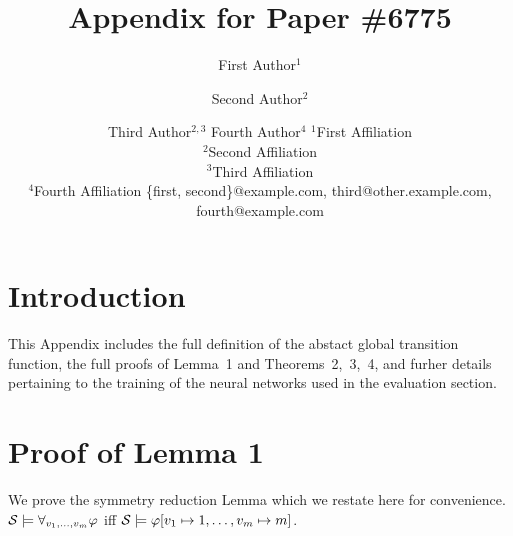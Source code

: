 \documentclass{article}
\title{Appendix for Paper \#6775}
\author{
}
\author{
First Author$^1$
\and
Second Author$^2$\and
Third Author$^{2,3}$\And
Fourth Author$^4$
\affiliations
$^1$First Affiliation\\
$^2$Second Affiliation\\
$^3$Third Affiliation\\
$^4$Fourth Affiliation
\emails
\{first, second\}@example.com,
third@other.example.com,
fourth@example.com
}
\newenvironment{customlemma}[1]
  {\renewcommand\theinnercustomlemma{#1}\innercustomlemma}
  {\endinnercustomlemma}
\begin{document}
\maketitle


\section{Introduction}

This Appendix includes the full definition of the abstact global transition
function, the full proofs of Lemma~1 and Theorems~2,~3,~4, and furher details
pertaining to the training of the neural networks used in the evaluation
section.

\section{Proof of Lemma 1} 
We prove the symmetry reduction Lemma which we restate here for convenience.
\begin{customlemma}{1}
$\mathcal S \models \forall_{v_1,\ldots,v_m} \varphi$ iff $\mathcal S \models \varphi[v_1 \mapsto 1, \ldots, v_m
\mapsto m]$.
\end{customlemma}
\end{document}
